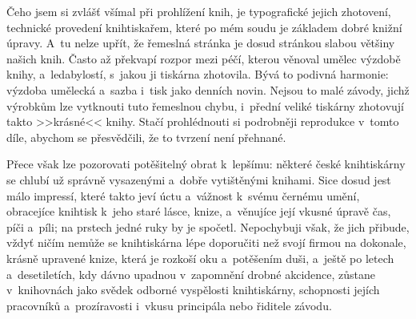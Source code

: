 
Čeho jsem si zvlášť všímal při prohlížení knih, je typografické jejich
zhotovení, technické provedení knihtiskařem, které po mém soudu je základem
dobré knižní úpravy. A~tu nelze upřít, že řemeslná stránka je dosud stránkou
slabou většiny našich knih. Často až překvapí rozpor mezi péčí, kterou
věnoval umělec výzdobě knihy, a~ledabylostí, s~jakou ji tiskárna zhotovila.
Bývá to podivná harmonie: výzdoba umělecká a~sazba i~tisk jako denních
novin. Nejsou to malé závody, jichž výrobkům lze vytknouti tuto řemeslnou
chybu, i~přední veliké tiskárny zhotovují takto >>krásné<< knihy. Stačí
prohlédnouti si podrobněji reprodukce v~tomto díle, abychom se přesvědčili, 
že to tvrzení není přehnané.

Přece však lze pozorovati potěšitelný obrat k~lepšímu: některé české
knihtiskárny se chlubí už správně vysazenými a~dobře vytištěnými knihami.
Sice dosud jest málo impressí, které takto jeví úctu a~vážnost k~svému
černému umění, obracejíce knihtisk k~jeho staré lásce, knize, a~věnujíce
její vkusné úpravě čas, píči a~píli; na prstech jedné ruky by je spočetl.
Nepochybuji však, že jich přibude, vždyť ničím nemůže se knihtiskárna
lépe doporučiti než svojí firmou na dokonale, krásně upravené knize, která
je rozkoší oku a~potěšením duši, a~ještě po letech a~desetiletích, kdy
dávno upadnou v~zapomnění drobné akcidence, zůstane v~knihovnách jako svědek
odborné vyspělosti knihtiskárny, schopnosti jejích pracovníků
a~prozíravosti i~vkusu principála nebo řiditele závodu.
